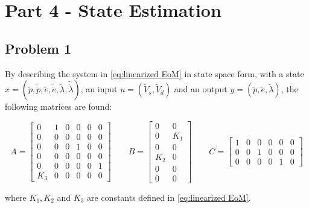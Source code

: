 

\section{Part 4 - State Estimation}
\subsection{Problem 1}

By describing the system in \cref{eq:linearized EoM} in state space form, with a state $x = (\tilde{p}, \tilde{\dot{p}}, \tilde{e}, \tilde{\dot{e}}, \tilde{\lambda}, \tilde{\dot{\lambda}})$, an input $u = (\tilde{V}_s, \tilde{V}_d)$ and an output $y = (\tilde{p}, \tilde{e}, \tilde{\lambda})$, the following matrices are found:

\begin{equation}
\label{eq:State space for estimator}
  A =
  \begin{bmatrix}
    0   & 1 & 0 & 0 & 0 & 0 \\
    0   & 0 & 0 & 0 & 0 & 0 \\
    0   & 0 & 0 & 1 & 0 & 0 \\
    0   & 0 & 0 & 0 & 0 & 0 \\
    0   & 0 & 0 & 0 & 0 & 1 \\
    K_3 & 0 & 0 & 0 & 0 & 0
  \end{bmatrix}
  \qquad
  B =
  \begin{bmatrix}
    0   & 0   \\
    0   & K_1 \\
    0   & 0   \\
    K_2 & 0   \\
    0   & 0   \\
    0   & 0
  \end{bmatrix}
	\qquad
	C = 
	\begin{bmatrix}
	1 & 0 & 0 & 0 & 0 & 0 \\
	0 & 0 & 1 & 0 & 0 & 0 \\
	0 & 0 & 0 & 0 & 1 & 0 
	\end{bmatrix}
\end{equation}

where $K_1, K_2$ and $K_3$ are constants defined in \cref{eq:linearized EoM}.